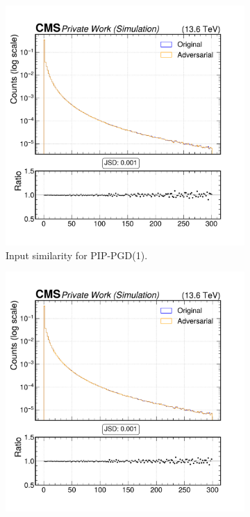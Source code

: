 \begin{figure}[htbp]
  \centering
  \begin{subfigure}[t]{0.32\textwidth}
    \includegraphics[width=\linewidth]{media/output/features/compare/combined_it_1/cmp_cpf_arr_Cpfcan_BtagPf_trackPPar.pdf}
    \caption*{Input similarity for PIP-PGD(1).}
  \end{subfigure}\hfill
  \begin{subfigure}[t]{0.32\textwidth}
    \includegraphics[width=\linewidth]{media/output/features/compare/combined_it_2/cmp_cpf_arr_Cpfcan_BtagPf_trackPPar.pdf}

\end{subfigure}
\end{figure}

